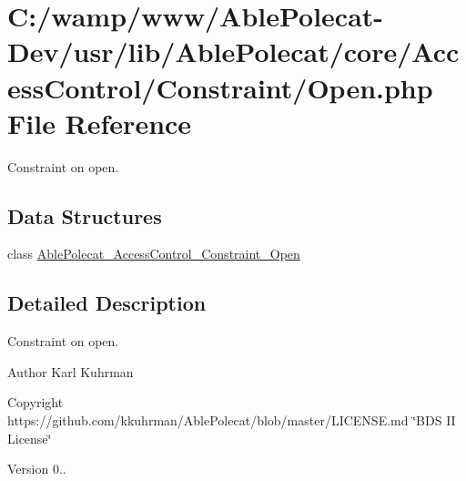 \hypertarget{_open_8php}{}\section{C\+:/wamp/www/\+Able\+Polecat-\/\+Dev/usr/lib/\+Able\+Polecat/core/\+Access\+Control/\+Constraint/\+Open.php File Reference}
\label{_open_8php}


Constraint on open.  


\subsection*{Data Structures}
\begin{DoxyCompactItemize}
\item 
class \hyperlink{class_able_polecat___access_control___constraint___open}{Able\+Polecat\+\_\+\+Access\+Control\+\_\+\+Constraint\+\_\+\+Open}
\end{DoxyCompactItemize}


\subsection{Detailed Description}
Constraint on open. 

\begin{DoxyAuthor}{Author}
Karl Kuhrman 
\end{DoxyAuthor}
\begin{DoxyCopyright}{Copyright}
https\+://github.com/kkuhrman/\+Able\+Polecat/blob/master/\+L\+I\+C\+E\+N\+S\+E.\+md \char`\"{}\+B\+D\+S I\+I License\char`\"{} 
\end{DoxyCopyright}
\begin{DoxyVersion}{Version}
0.. 
\end{DoxyVersion}
